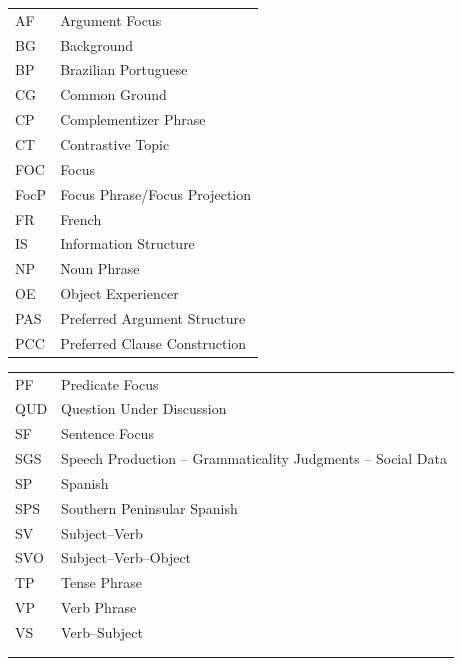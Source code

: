 \addchap{\lsAbbreviationsTitle}

\begin{tabularx}{.45\textwidth}{lQ}
AF&Argument Focus\\
BG&Background\\
BP&Brazilian Portuguese\\
CG&Common Ground\\
CP&Complementizer Phrase\\
CT&Contrastive Topic\\
FOC&Focus\\
FocP&Focus Phrase{\slash}Focus Projection\\
FR&French\\
IS&Information Structure\\
NP&Noun Phrase\\
OE&Object Experiencer\\
PAS&Preferred Argument Structure\\
PCC&Preferred Clause Construction\\
\end{tabularx}\begin{tabularx}{.45\textwidth}{lQ}
PF&Predicate Focus\\
QUD&Question Under Discussion\\
SF&Sentence Focus\\
SGS&Speech Production -- Grammaticality Judgments -- Social Data\\
SP&Spanish\\
SPS&Southern Peninsular Spanish\\
SV&Subject–Verb\\
SVO&Subject–Verb–Object\\
TP&Tense Phrase\\
VP&Verb Phrase\\
VS&Verb–Subject\\
\\
\\
\end{tabularx}